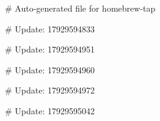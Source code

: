 # Auto-generated file for homebrew-tap

# Update: 17929594833

# Update: 17929594951

# Update: 17929594960

# Update: 17929594972

# Update: 17929595042
